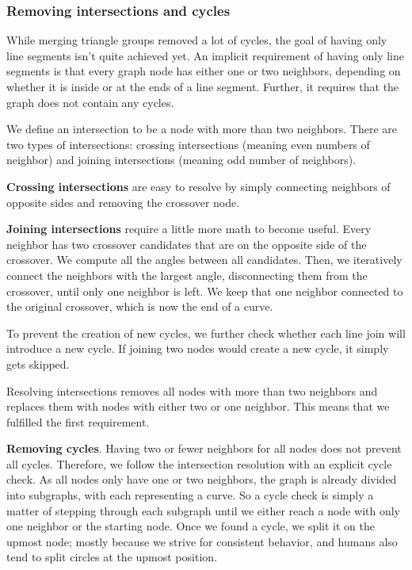 \subsubsection{Removing intersections and cycles}
While merging triangle groups removed a lot of cycles, the goal of having only line segments isn't quite achieved yet. An implicit requirement of having only line segments is that every graph node has either one or two neighbors, depending on whether it is inside or at the ends of a line segment. Further, it requires that the graph does not contain any cycles.

We define an intersection to be a node with more than two neighbors. There are two types of intersections: crossing intersections (meaning even numbers of neighbor) and joining intersections (meaning odd number of neighbors).

\textbf{Crossing intersections} are easy to resolve by simply connecting neighbors of opposite sides and removing the crossover node.

\textbf{Joining intersections} require a little more math to become useful. Every neighbor has two crossover candidates that are on the opposite side of the crossover. We compute all the angles between all candidates. Then, we iteratively connect the neighbors with the largest angle, disconnecting them from the crossover, until only one neighbor is left. We keep that one neighbor connected to the original crossover, which is now the end of a curve.

To prevent the creation of new cycles, we further check whether each line join will introduce a new cycle. If joining two nodes would create a new cycle, it simply gets skipped.

Resolving intersections removes all nodes with more than two neighbors and replaces them with nodes with either two or one neighbor. This means that we fulfilled the first requirement.

\textbf{Removing cycles}. Having two or fewer neighbors for all nodes does not prevent all cycles. Therefore, we follow the intersection resolution with an explicit cycle check. As all nodes only have one or two neighbors, the graph is already divided into subgraphs, with each representing a curve. So a cycle check is simply a matter of stepping through each subgraph until we either reach a node with only one neighbor or the starting node. Once we found a cycle, we split it on the upmost node; mostly because we strive for consistent behavior, and humans also tend to split circles at the upmost position.


